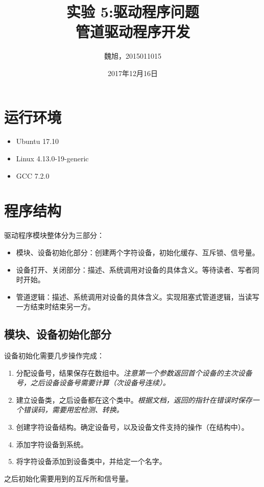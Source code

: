 \documentclass{article}
\title{实验 5:驱动程序问题\\管道驱动程序开发}
\author{魏旭，2015011015}
\date{2017年12月16日}
\begin{document}
\renewcommand{\contentsname}{目录}
\begin{titlepage}
\maketitle
\tableofcontents
\end{titlepage}

\section{运行环境}
\begin{itemize}
    \item Ubuntu 17.10
    \item Linux 4.13.0-19-generic
    \item GCC 7.2.0
\end{itemize}

\section{程序结构}
驱动程序模块整体分为三部分：
\begin{itemize}
    \item 模块、设备初始化部分：创建两个字符设备，初始化缓存、互斥锁、信号量。
    \item 设备打开、关闭部分：描述、系统调用对设备的具体含义。等待读者、写者同时开始。
    \item 管道逻辑：描述、系统调用对设备的具体含义。实现阻塞式管道逻辑，当读写一方结束时结束另一方。
\end{itemize}

\subsection{模块、设备初始化部分}

设备初始化需要几步操作完成：
\begin{enumerate}
    \item {}分配设备号，结果保存在数组中。\emph{注意第一个参数返回首个设备的主次设备号，之后设备设备号需要计算（次设备号连续）。}
    
    \item {}建立设备类，之后设备都在这个类中。\emph{根据文档，返回的指针在错误时保存一个错误码，需要用宏检测、转换。}
    
    \item {}创建字符设备结构。确定设备号，以及设备文件支持的操作（在结构中）。
    
    \item {}添加字符设备到系统。
    
    \item {}将字符设备添加到设备类中，并给定一个名字。
\end{enumerate}
之后初始化需要用到的互斥所和信号量。
\end{document}
